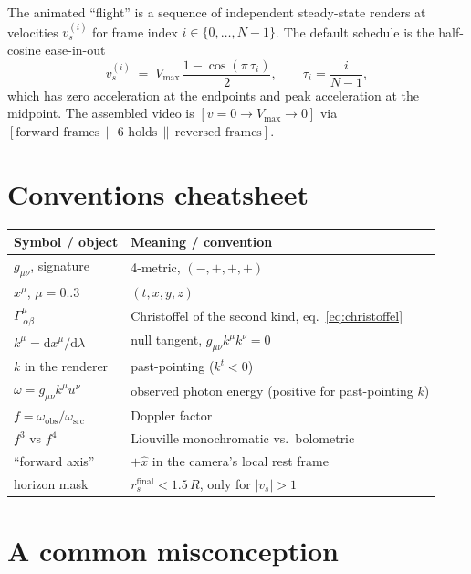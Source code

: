 \documentclass[11pt]{article}
\newcommand{\diff}{\mathrm{d}}
\newcommand{\Christ}[3]{\Gamma^{#1}_{\,#2 #3}}
\begin{document}
The animated ``flight'' is a sequence of independent steady-state renders
at velocities $v_s^{(i)}$ for frame index $i\in\{0,\dots,N\!-\!1\}$.  The
default schedule is the half-cosine ease-in-out
\begin{equation}
v_s^{(i)} \;=\; V_{\max}\,\frac{1-\cos(\pi\,\tau_i)}{2}, \qquad \tau_i = \frac{i}{N-1},
\label{eq:schedule}
\end{equation}
which has zero acceleration at the endpoints and peak acceleration at the
midpoint.  The assembled video is $[v=0\to V_{\max}\to 0]$ via
$[\text{forward frames}\,\|\,\text{6 holds}\,\|\,\text{reversed frames}]$.

\section{Conventions cheatsheet}

\begin{center}\small
\begin{tabular}{ll}
\toprule
Symbol / object & Meaning / convention \\
\midrule
$g_{\mu\nu}$, signature & 4-metric, $(-,+,+,+)$ \\
$x^\mu$, $\mu=0..3$ & $(t,x,y,z)$ \\
$\Christ{\mu}{\alpha}{\beta}$ & Christoffel of the second kind, eq.~\eqref{eq:christoffel} \\
$k^\mu = \diff x^\mu/\diff\lambda$ & null tangent, $g_{\mu\nu}k^\mu k^\nu=0$ \\
$k$ in the renderer & past-pointing ($k^t<0$) \\
$\omega = g_{\mu\nu}k^\mu u^\nu$ & observed photon energy (positive for past-pointing $k$) \\
$f = \omega_{\text{obs}}/\omega_{\text{src}}$ & Doppler factor \\
$f^3$ vs $f^4$ & Liouville monochromatic vs.\ bolometric \\
``forward axis'' & $+\hat x$ in the camera's local rest frame \\
horizon mask & $r_s^{\text{final}} < 1.5\,R$, only for $|v_s|>1$ \\
\bottomrule
\end{tabular}
\end{center}

\section{A common misconception}
\end{document}
